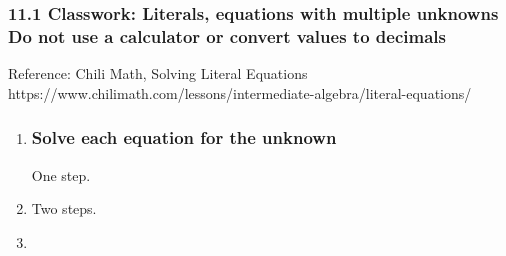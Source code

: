 \documentclass[12pt, twoside]{article}
\begin{document}
\subsubsection*{11.1 Classwork: Literals, equations with multiple unknowns \\
Do not use a calculator or convert values to decimals}
Reference: Chili Math, Solving Literal Equations \\
https://www.chilimath.com/lessons/intermediate-algebra/literal-equations/

\begin{enumerate}

\subsubsection*{Simplify each expression by ``collecting like terms''}
\item 
\begin{enumerate}[itemsep=2cm]
  \end{enumerate} \vspace{0.5cm}

\subsubsection*{Solve each equation for the unknown}

One step.
\item 
\begin{enumerate}[itemsep=2cm]
  \end{enumerate} \vspace{1cm}

  Two steps.
\item 
\begin{enumerate}[itemsep=2cm]
  \end{enumerate} 


\end{enumerate}
\end{document}
